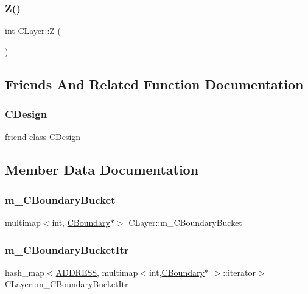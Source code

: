 \subsubsection{\texorpdfstring{Z()}{Z()}}
{\footnotesize\ttfamily int C\+Layer\+::Z (\begin{DoxyParamCaption}{ }\end{DoxyParamCaption})}



\subsection{Friends And Related Function Documentation}
\mbox{\label{classCLayer_a456d9ce965c42b2974ac760295a30cc6}} 
\subsubsection{\texorpdfstring{CDesign}{CDesign}}
{\footnotesize\ttfamily friend class \mbox{\hyperlink{classCDesign}{C\+Design}}\hspace{0.3cm}{\ttfamily [friend]}}



\subsection{Member Data Documentation}
\mbox{\label{classCLayer_a92dce7beca8ec4fa0ad07a46114c1f68}} 
\subsubsection{\texorpdfstring{m\_CBoundaryBucket}{m\_CBoundaryBucket}}
{\footnotesize\ttfamily multimap$<$int, \mbox{\hyperlink{classCBoundary}{C\+Boundary}}$\ast$$>$ C\+Layer\+::m\+\_\+\+C\+Boundary\+Bucket}

\mbox{\label{classCLayer_afe3a156ca744d73f927f19fb320d50c3}} 
\subsubsection{\texorpdfstring{m\_CBoundaryBucketItr}{m\_CBoundaryBucketItr}}
{\footnotesize\ttfamily hash\+\_\+map$<$\mbox{\hyperlink{BoxRouter_8h_a280feb883e9d4a7edcc69c8bcb9f38f2}{A\+D\+D\+R\+E\+SS}}, multimap$<$int,\mbox{\hyperlink{classCBoundary}{C\+Boundary}}$\ast$ $>$\+::iterator$>$ C\+Layer\+::m\+\_\+\+C\+Boundary\+Bucket\+Itr}

